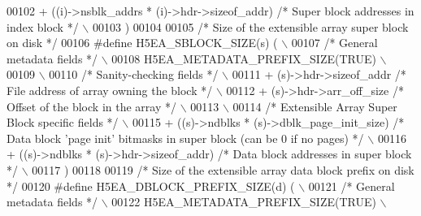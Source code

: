 \begin{DoxyCode}
00102 \textcolor{preprocessor}{    + ((i)->nsblk\_addrs * (i)->hdr->sizeof\_addr) }\textcolor{comment}{/* Super block addresses in index block  */}\textcolor{preprocessor}{ \(\backslash\)}
00103 \textcolor{preprocessor}{    )}
00104 
00105 \textcolor{comment}{/* Size of the extensible array super block on disk */}
00106 \textcolor{preprocessor}{#define H5EA\_SBLOCK\_SIZE(s)     (                                             \(\backslash\)}
00107 \textcolor{preprocessor}{    }\textcolor{comment}{/* General metadata fields */}\textcolor{preprocessor}{                                             \(\backslash\)}
00108 \textcolor{preprocessor}{    H5EA\_METADATA\_PREFIX\_SIZE(TRUE)                                           \(\backslash\)}
00109 \textcolor{preprocessor}{                                                                              \(\backslash\)}
00110 \textcolor{preprocessor}{    }\textcolor{comment}{/* Sanity-checking fields */}\textcolor{preprocessor}{                                              \(\backslash\)}
00111 \textcolor{preprocessor}{    + (s)->hdr->sizeof\_addr          }\textcolor{comment}{/* File address of array owning the block */}\textcolor{preprocessor}{ \(\backslash\)}
00112 \textcolor{preprocessor}{    + (s)->hdr->arr\_off\_size         }\textcolor{comment}{/* Offset of the block in the array */}\textcolor{preprocessor}{   \(\backslash\)}
00113 \textcolor{preprocessor}{                                                                              \(\backslash\)}
00114 \textcolor{preprocessor}{    }\textcolor{comment}{/* Extensible Array Super Block specific fields */}\textcolor{preprocessor}{                        \(\backslash\)}
00115 \textcolor{preprocessor}{    + ((s)->ndblks * (s)->dblk\_page\_init\_size) }\textcolor{comment}{/* Data block 'page init' bitmasks in super block (can be 0
       if no pages) */}\textcolor{preprocessor}{ \(\backslash\)}
00116 \textcolor{preprocessor}{    + ((s)->ndblks * (s)->hdr->sizeof\_addr) }\textcolor{comment}{/* Data block addresses in super block  */}\textcolor{preprocessor}{ \(\backslash\)}
00117 \textcolor{preprocessor}{    )}
00118 
00119 \textcolor{comment}{/* Size of the extensible array data block prefix on disk */}
00120 \textcolor{preprocessor}{#define H5EA\_DBLOCK\_PREFIX\_SIZE(d)  (                                         \(\backslash\)}
00121 \textcolor{preprocessor}{    }\textcolor{comment}{/* General metadata fields */}\textcolor{preprocessor}{                                             \(\backslash\)}
00122 \textcolor{preprocessor}{    H5EA\_METADATA\_PREFIX\_SIZE(TRUE)                                           \(\backslash\)}

\end{DoxyCode}
